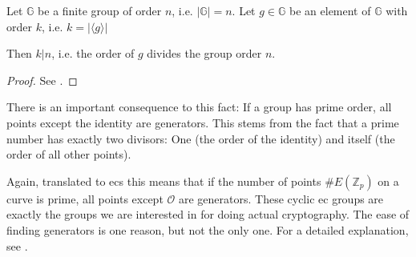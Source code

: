 \begin{theorem}\cite{katz_introduction_2015}
    Let $\mathbb{G}$ be a finite group of order $n$, i.e. $|\mathbb{G}| = n$.
    Let $g \in \mathbb{G}$ be an element of $\mathbb{G}$ with order $k$, i.e. $k = |\langle g \rangle |$

    Then $k|n$, i.e. the order of $g$ divides the group order $n$.
\end{theorem}
\begin{proof}
    See \cite*[Proposition 8.54]{katz_introduction_2015}.
\end{proof}

There is an important consequence to this fact: If a group has prime order, all points except the identity are generators.
This stems from the fact that a prime number has exactly two divisors: One (the order of the identity) and itself (the order of all other points).

Again, translated to \glspl{ec} this means that if the number of points $\#E(\mathbb{Z}_p)$ on a curve is prime, all points except $\mathcal{O}$ are generators.
These cyclic \gls{ec} groups are exactly the groups we are interested in for doing actual cryptography.
The ease of finding generators is one reason, but not the only one. 
For a detailed explanation, see \cite[p.~321]{katz_introduction_2015}.






